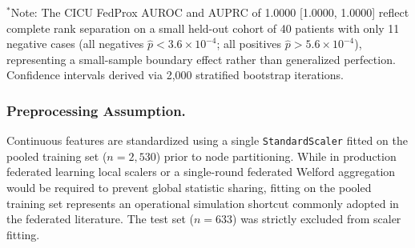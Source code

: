 \documentclass[runningheads]{llncs}
\begin{document}
\begin{table}[t]
\caption{Care-unit cohort distributions and disaggregated federated test performance}
\label{tab:cohort-dist}
\centering
\small
{}
\vspace{1mm}
\raggedright \scriptsize $^*$Note: The CICU FedProx AUROC and AUPRC of 1.0000 [1.0000, 1.0000] reflect complete rank separation on a small held-out cohort of 40 patients with only 11 negative cases (all negatives $\hat{p} < 3.6\times 10^{-4}$; all positives $\hat{p} > 5.6\times 10^{-4}$), representing a small-sample boundary effect rather than generalized perfection. Confidence intervals derived via 2,000 stratified bootstrap iterations.
\end{table}

\subsubsection{Preprocessing Assumption.} Continuous features are standardized using a single \texttt{StandardScaler} fitted on the pooled training set ($n = 2{,}530$) prior to node partitioning. While in production federated learning local scalers or a single-round federated Welford aggregation would be required to prevent global statistic sharing, fitting on the pooled training set represents an operational simulation shortcut commonly adopted in the federated literature. The test set ($n = 633$) was strictly excluded from scaler fitting.
\end{document}

